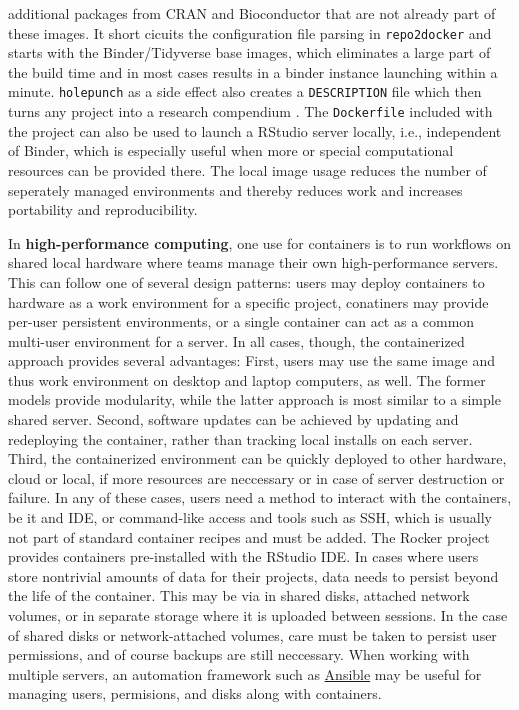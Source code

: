 additional packages from CRAN and Bioconductor that are not already part
of these images. It short cicuits the configuration file parsing in
\texttt{repo2docker} and starts with the Binder/Tidyverse base images,
which eliminates a large part of the build time and in most cases
results in a binder instance launching within a minute.
\texttt{holepunch} as a side effect also creates a \texttt{DESCRIPTION}
file which then turns any project into a research compendium
\citep{marwick_packaging_2018}. The \texttt{Dockerfile} included with
the project can also be used to launch a RStudio server locally, i.e.,
independent of Binder, which is especially useful when more or special
computational resources can be provided there. The local image usage
reduces the number of seperately managed environments and thereby
reduces work and increases portability and reproducibility.

In \textbf{high-performance computing}, one use for containers is to run
workflows on shared local hardware where teams manage their own
high-performance servers. This can follow one of several design
patterns: users may deploy containers to hardware as a work environment
for a specific project, conatiners may provide per-user persistent
environments, or a single container can act as a common multi-user
environment for a server. In all cases, though, the containerized
approach provides several advantages: First, users may use the same
image and thus work environment on desktop and laptop computers, as
well. The former models provide modularity, while the latter approach is
most similar to a simple shared server. Second, software updates can be
achieved by updating and redeploying the container, rather than tracking
local installs on each server. Third, the containerized environment can
be quickly deployed to other hardware, cloud or local, if more resources
are neccessary or in case of server destruction or failure. In any of
these cases, users need a method to interact with the containers, be it
and IDE, or command-like access and tools such as SSH, which is usually
not part of standard container recipes and must be added. The Rocker
project provides containers pre-installed with the RStudio IDE. In cases
where users store nontrivial amounts of data for their projects, data
needs to persist beyond the life of the container. This may be via in
shared disks, attached network volumes, or in separate storage where it
is uploaded between sessions. In the case of shared disks or
network-attached volumes, care must be taken to persist user
permissions, and of course backups are still neccessary. When working
with multiple servers, an automation framework such as
\href{https://www.ansible.com}{Ansible} may be useful for managing
users, permisions, and disks along with containers.

